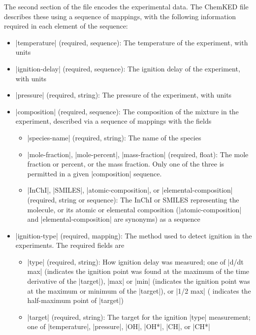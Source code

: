 \documentclass[12pt]{ijck}
\newcommand\ck{ChemKED}
\begin{document}
The second section of the file encodes the experimental data. The \ck{} file
describes these using a sequence of mappings, with the following information required
in each element of the sequence:
%
\begin{itemize}
    \item \yabox|temperature| (required, sequence): The temperature of the
    experiment, with units
    \item \yabox|ignition-delay| (required, sequence): The ignition delay of the
    experiment, with units
    \item \yabox|pressure| (required, string): The pressure of the experiment,
    with units
    \item \yabox|composition| (required, sequence): The composition of the
    mixture in the experiment, described via a sequence of mappings with the fields
    \begin{itemize}
        \item \yabox|species-name| (required, string): The name of the species
        \item \yabox|mole-fraction|, \yabox|mole-percent|, \yabox|mass-fraction|
        (required, float): The mole fraction or percent, or the mass fraction.
        Only one of the three is permitted in a given \yabox|composition|
        sequence.
        \item \yabox|InChI|, \yabox|SMILES|, \yabox|atomic-composition|, or
        \yabox|elemental-composition| (required, string or sequence): The InChI
        or SMILES representing the molecule, or its atomic or elemental
        composition (\yabox|atomic-composition| and
        \yabox|elemental-composition| are synonyms) as a sequence
    \end{itemize}
    \item \yabox|ignition-type| (required, mapping): The method used to detect
    ignition in the experiments. The required fields are
    \begin{itemize}
        \item \yabox|type| (required, string): How ignition delay was
        measured; one of \yabox|d/dt max| (indicates the ignition point was
        found at the maximum of the time derivative of the \yabox|target|),
        \yabox|max| or \yabox|min| (indicates the ignition point was at the
        maximum or minimum of the \yabox|target|), or \yabox|1/2 max| (
        indicates the half-maximum point of \yabox|target|)
        \item \yabox|target| (required, string): The target for the ignition
        \yabox|type| measurement; one of \yabox|temperature|, \yabox|pressure|,
        \yabox|OH|, \yabox|OH*|, \yabox|CH|, or \yabox|CH*|
    \end{itemize}
\end{itemize}
\end{document}
